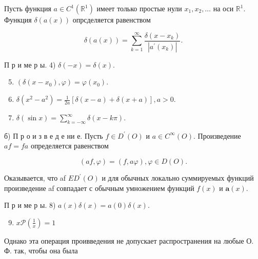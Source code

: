 \documentclass[10pt]{article}
\begin{document}
Пусть функция $a \in C^{1}\left(\mathbb{R}^{1}\right)$ имеет только простые нули $x_{1}, x_{2}, \ldots$ на оси $\mathbb{R}^{1}$. Функция $\delta(a(x))$ опрсделяется равенством



\[

\delta(a(x))=\sum_{k=1}^{\infty} \frac{\delta\left(x-x_{k}\right)}{\left|a^{\prime}\left(x_{k}\right)\right|} .

\]



П р и ме р ы. 4) $\delta(-x)=\delta(x)$.



\begin{enumerate}

  \setcounter{enumi}{4}

  \item $\left(\delta\left(x-x_{0}\right), \varphi\right)=\varphi\left(x_{0}\right)$.



  \item $\delta\left(x^{2}-a^{2}\right)=\frac{1}{2 a}[\delta(x-a)+\delta(x+a)], a>0$.



  \item $\delta(\sin x)=\sum_{k=-\infty}^{\infty} \delta(x-k \pi)$.



\end{enumerate}



б) П р о и з в е д е ни е. Пусть $f \in D^{\prime}(O)$ и $a \in C^{\infty}(O)$. Произведение $a f=f a$ определяется равенством



\[

(a f, \varphi)=(f, a \varphi), \varphi \in D(O) .

\]



Оказывается, что af $E D^{\prime}(O)$ и для обычных локально суммируемых функций произведение af совпадает с обычным умножением функций $f(x)$ и $\boldsymbol{a}(x)$.



П р и ме р ы. 8) $a(x) \delta(x)=a(0) \delta(x)$.



\begin{enumerate}

  \setcounter{enumi}{8}

  \item $x \mathscr{P}\left(\frac{1}{x}\right)=1$

\end{enumerate}



Однако эта операция проивведения не допускает распространения на любые О. Ф. так, чтобы она была
\end{document}
